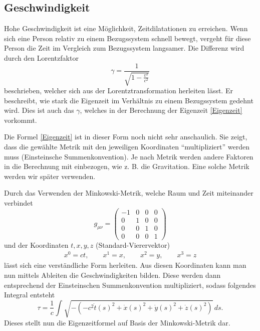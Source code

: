 \begin{refsection}
\subsection{Geschwindigkeit}
Hohe Geschwindigkeit ist eine Möglichkeit, Zeitdilatationen zu erreichen. Wenn sich eine Person relativ zu einem Bezugssystem schnell bewegt, vergeht für diese Person die Zeit im Vergleich zum Bezugssystem langsamer. Die Differenz wird durch den Lorentzfaktor 
\begin{equation} \label{lorentzfaktor}
\gamma=\frac{1}{\sqrt{1-\displaystyle\frac{v^2}{c^2}}} 
\end{equation}
beschrieben, welcher sich aus der Lorentztransformation herleiten lässt.
Er beschreibt, wie stark die Eigenzeit im Verhältnis zu einem Bezugssystem gedehnt wird. 
Dies ist auch das $\gamma$, welches in der Berechnung der Eigenzeit \eqref{Eigenzeit} vorkommt. 

Die Formel \eqref{Eigenzeit} ist in dieser Form noch nicht sehr anschaulich. Sie zeigt, dass die gewählte Metrik mit den jeweiligen Koordinaten ``multipliziert'' werden muss (Einsteinsche Summenkonvention). Je nach Metrik werden andere Faktoren in die Berechnung mit einbezogen, wie z. B. die Gravitation. Eine solche Metrik werden wir später verwenden.

Durch das Verwenden der Minkowski-Metrik, welche Raum und Zeit miteinander verbindet 
\begin{equation}
    g_{\mu\nu}=
    \begin{pmatrix}
        -1 & 0 & 0 & 0 \\
        0 & 1 & 0 & 0 \\
        0 & 0 & 1 & 0 \\
        0 & 0 & 0 & 1
    \end{pmatrix}
\end{equation}
und der Koordinaten $t, x, y, z$ (Standard-Vierervektor)
\begin{align*}
x^{0}=ct,\qquad x^{1}=x,\qquad x^{2}=y,\qquad x^{3}=z 
\end{align*}
lässt sich eine verständliche Form herleiten.
Aus diesen Koordinaten kann man nun mittels Ableiten die Geschwindigkeiten bilden. Diese werden dann entsprechend der Einsteinschen Summenkonvention multipliziert, sodass folgendes Integral entsteht 
\begin{equation}\label{minkowski}
    \tau
    =
    \frac{1}{c}\int_{}^{}\sqrt{-(-c^2\dot{t}(s)^{2}+\dot{x}(s)^{2}+\dot{y}(s)^{2}+\dot{z}(s)^{2})}\,ds.
\end{equation} 
Dieses stellt nun die Eigenzeitformel auf Basis der Minkowski-Metrik dar.


\end{refsection}
